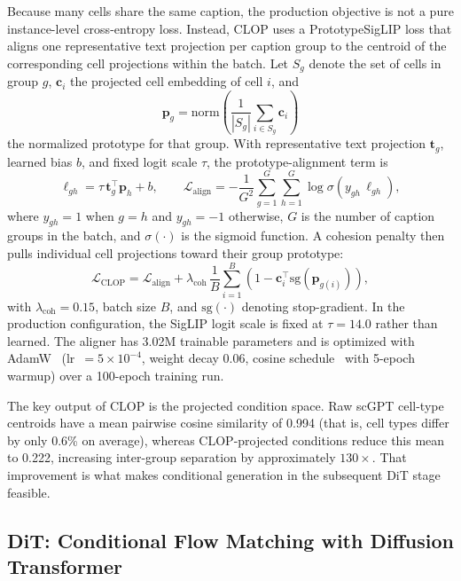 Because many cells share the same caption, the production objective is not a pure instance-level cross-entropy loss. Instead, CLOP uses a PrototypeSigLIP loss that aligns one representative text projection per caption group to the centroid of the corresponding cell projections within the batch. Let $S_g$ denote the set of cells in group $g$, $\mathbf{c}_i$ the projected cell embedding of cell $i$, and
\begin{equation}
\mathbf{p}_g = \mathrm{norm}\!\left(\frac{1}{|S_g|}\sum_{i \in S_g} \mathbf{c}_i\right)
\end{equation}
the normalized prototype for that group. With representative text projection $\mathbf{t}_g$, learned bias $b$, and fixed logit scale $\tau$, the prototype-alignment term is
\begin{equation}
\ell_{gh} = \tau\,\mathbf{t}_g^\top \mathbf{p}_h + b, \qquad
\mathcal{L}_\text{align} = -\frac{1}{G^2}\sum_{g=1}^{G}\sum_{h=1}^{G}\log\sigma\!\left(y_{gh}\,\ell_{gh}\right),
\label{eq:clop}
\end{equation}
where $y_{gh}=1$ when $g=h$ and $y_{gh}=-1$ otherwise, $G$ is the number of caption groups in the batch, and $\sigma(\cdot)$ is the sigmoid function. A cohesion penalty then pulls individual cell projections toward their group prototype:
\begin{equation}
\mathcal{L}_\text{CLOP} = \mathcal{L}_\text{align} + \lambda_\text{coh}\,\frac{1}{B}\sum_{i=1}^{B}\left(1 - \mathbf{c}_i^\top \mathrm{sg}(\mathbf{p}_{g(i)})\right),
\end{equation}
with $\lambda_\text{coh}=0.15$, batch size $B$, and $\mathrm{sg}(\cdot)$ denoting stop-gradient. In the production configuration, the SigLIP logit scale is fixed at $\tau = 14.0$ rather than learned. The aligner has 3.02M trainable parameters and is optimized with AdamW~\citep{ref-adamw} (lr~$= 5 \times 10^{-4}$, weight decay 0.06, cosine schedule~\citep{ref-cosine-schedule} with 5-epoch warmup) over a 100-epoch training run.

The key output of CLOP is the projected condition space. Raw scGPT cell-type centroids have a mean pairwise cosine similarity of 0.994 (that is, cell types differ by only 0.6\% on average), whereas CLOP-projected conditions reduce this mean to 0.222, increasing inter-group separation by approximately $130\times$. That improvement is what makes conditional generation in the subsequent DiT stage feasible.

\subsection{DiT: Conditional Flow Matching with Diffusion Transformer}\label{sec:dit}

